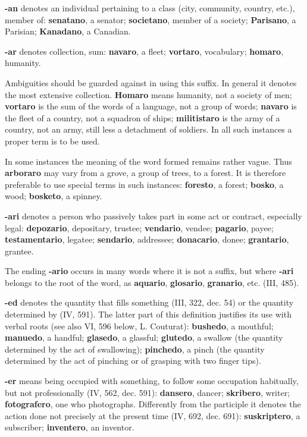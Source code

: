 \textbf{-an} denotes an individual pertaining to a class (city, community, country, etc.), member of: \textbf{senatano}, a senator; \textbf{societano}, member of a society; \textbf{Parisano}, a Parisian; \textbf{Kanadano}, a Canadian. 

\textbf{-ar} denotes collection, sum: \textbf{navaro}, a fleet; \textbf{vortaro}, vocabulary; \textbf{homaro}, humanity. 

Ambiguities should be guarded against in using this suffix. In general it denotes the most extensive collection. \textbf{Homaro} means humanity, not a society of men; \textbf{vortaro} is the sum of the words of a language, not a group of words; \textbf{navaro} is the fleet of a country, not a squadron of ships; \textbf{militistaro} is the army of a country, not an army, still less a detachment of soldiers. In all such instances a proper term is to be used. 

In some instances the meaning of the word formed remains rather vague. Thus \textbf{arboraro} may vary from a grove, a group of trees, to a forest. It is therefore preferable to use special terms in such instances: \textbf{foresto}, a forest; \textbf{bosko}, a wood; \textbf{bosketo}, a spinney. 

\textbf{-ari} denotes a person who passively takes part in some act or contract, especially legal: \textbf{depozario}, depositary, trustee; \textbf{vendario}, vendee; \textbf{pagario}, payee; \textbf{testamentario}, legatee; \textbf{sendario}, addressee; \textbf{donacario}, donee; \textbf{grantario}, grantee. 

The ending \textbf{-ario} occurs in many words where it is not a suffix, but where \textbf{-ari} belongs to the root of the word, as \textbf{aquario}, \textbf{glosario}, \textbf{granario}, etc. (III, 485). 

\textbf{-ed} denotes the quantity that fills something (III, 322, dec. 54) or the quantity determined by (IV, 591). The latter part of this definition justifies its use with verbal roots (see also VI, 596 below, L. Couturat): \textbf{bushedo}, a mouthful; \textbf{manuedo}, a handful; \textbf{glasedo}, a glassful; \textbf{glutedo}, a swallow (the quantity determined by the act of swallowing); \textbf{pinchedo}, a pinch (the quantity determined by the act of pinching or of grasping with two finger tips). 

\textbf{-er} means being occupied with something, to follow some occupation habitually, but not professionally (IV, 562, dec. 591): \textbf{dansero}, dancer; \textbf{skribero}, writer; \textbf{fotografero}, one who photographs. Differently from the participle it denotes the action done not precisely at the present time (IV, 692, dec. 691): \textbf{suskriptero}, a subscriber; \textbf{inventero}, an inventor. 

